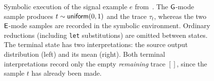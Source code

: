\begin{figure}[t]
{\begin{tikzpicture}
\end{tikzpicture}%
}
\caption{Symbolic execution of the signal example $e$ from~.
The $\mathsf{G}$-mode sample produces $t\sim\mathsf{uniform}(0,1)$ and the trace
$\tau_t$, whereas the two $\mathsf{E}$-mode samples are recorded in the symbolic
environment. Ordinary reductions (including \texttt{let} substitutions) are
omitted between states. The terminal state has two interpretations: the source
output distribution (left) and its mean (right). Both terminal interpretations
record only the empty \emph{remaining} trace $[]$, since the sample $t$ has
already been made.}
\label{fig:symbolic-example}
\end{figure}
